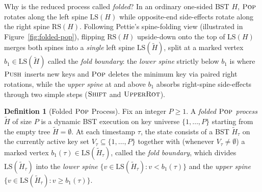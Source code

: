 \documentclass[11pt]{article}
\theoremstyle{definition}
\newtheorem{definition}[theorem]{Definition}
\theoremstyle{remark}
\newcommand{\LS}{\mathrm{LS}}
\newcommand{\RS}{\mathrm{RS}}
\newcommand{\PUSH}{\textnormal{\scshape Push}}
\newcommand{\POP}{\textnormal{\scshape Pop}}
\newcommand{\SHIFT}{\textnormal{\scshape Shift}}
\newcommand{\UPROT}{\textnormal{\scshape UpperRot}}
\begin{document}
Why is the reduced process called \emph{folded}? In an ordinary one-sided BST $H$, $\POP$ rotates along the left spine $\LS(H)$ while opposite-end side-effects rotate along the right spine $\RS(H)$. Following Pettie's spine-folding view (illustrated in Figure~\ref{fig:folded-pop}), flipping $\RS(H)$ upside-down onto the top of $\LS(H)$ merges both spines into a \emph{single} left spine $\LS(\widetilde{H})$, split at a marked vertex $b_1 \in \LS(\widetilde{H})$ called the \emph{fold boundary}: the \emph{lower spine} strictly below $b_1$ is where $\PUSH$ inserts new keys and $\POP$ deletes the minimum key via paired right rotations, while the \emph{upper spine} at and above $b_1$ absorbs right-spine side-effects through two simple steps ($\SHIFT$ and $\UPROT$).

\begin{definition}[Folded $\POP$ Process]
\label{def:folded-pop}
Fix an integer $P \ge 1$. A \emph{folded $\POP$ process} $\widetilde{H}$ of size $P$ is a dynamic BST execution on key universe $\{1, \dots, P\}$ starting from the empty tree $\widetilde{H} = \emptyset$. At each timestamp $\tau$, the state consists of a BST $\widetilde{H}_\tau$ on the currently active key set $V_\tau \subseteq \{1, \dots, P\}$ together with (whenever $V_\tau \ne \emptyset$) a marked vertex $b_1(\tau) \in \LS(\widetilde{H}_\tau)$, called the \emph{fold boundary}, which divides $\LS(\widetilde{H}_\tau)$ into the \emph{lower spine} $\{v \in \LS(\widetilde{H}_\tau) : v < b_1(\tau)\}$ and the \emph{upper spine} $\{v \in \LS(\widetilde{H}_\tau) : v \ge b_1(\tau)\}$.


\end{definition}
\end{document}
